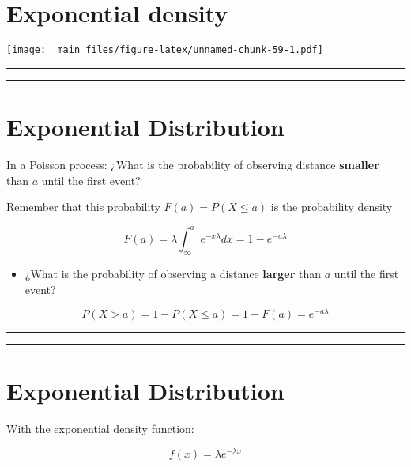 \documentclass[
]{book}
\providecommand{\tightlist}{%
  \setlength{\itemsep}{0pt}\setlength{\parskip}{0pt}}
\begin{document}
\hypertarget{exponential-density-4}{%
\section{Exponential density}\label{exponential-density-4}}

\texttt{[image: \_main\_files/figure-latex/unnamed-chunk-59-1.pdf]}

\begin{center}\rule{0.5\linewidth}{0.5pt}\end{center}

\begin{center}\rule{0.5\linewidth}{0.5pt}\end{center}

\hypertarget{exponential-distribution}{%
\section{Exponential Distribution}\label{exponential-distribution}}

In a Poisson process: ¿What is the probability of observing distance \textbf{smaller} than \(a\) until the first event?

Remember that this probability \(F(a)=P(X \leq a)\) is the probability density

\[F(a)=\lambda \int_\infty^a e^{-x\lambda}dx=1-e^{-a\lambda}\]

\begin{itemize}
\tightlist
\item
  ¿What is the probability of observing a distance \textbf{larger} than \(a\) until the first event?
\end{itemize}

\[P(X > a)=1- P(X \leq a)= 1- F(a) = e^{-a\lambda}\]

\begin{center}\rule{0.5\linewidth}{0.5pt}\end{center}

\begin{center}\rule{0.5\linewidth}{0.5pt}\end{center}

\hypertarget{exponential-distribution-1}{%
\section{Exponential Distribution}\label{exponential-distribution-1}}

With the exponential density function:

\[f(x)=\lambda e^{-\lambda x}\]
\end{document}
